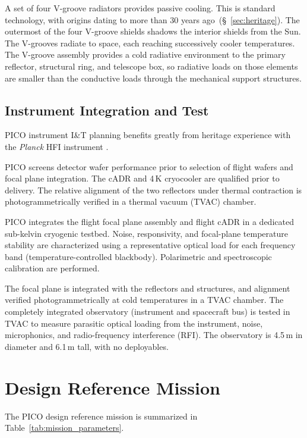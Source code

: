 A set of four V-groove radiators provides passive cooling. This is standard technology, with origins dating to more than 30 years ago~(\S~\ref{sec:heritage}). The outermost of the four V-groove shields shadows the interior shields from the Sun. The V-grooves radiate to space, each reaching successively cooler temperatures.
The V-groove assembly provides a cold radiative environment to the primary reflector, structural ring, and telescope box, so radiative loads on those elements are smaller than the conductive loads through the mechanical support structures.


\subsection{Instrument Integration and Test}
\label{sec:iandt} %

PICO instrument I\&T planning benefits greatly from heritage
experience with the \textit{Planck} HFI instrument \citep{ Pajot2010}.

PICO screens detector wafer performance prior to selection of
flight wafers and focal plane integration. The cADR and 4\,K
cryocooler are qualified prior to delivery. The relative alignment
of the two reflectors under thermal contraction is
photogrammetrically verified in a thermal vacuum (TVAC) chamber.

PICO integrates the flight focal plane assembly and flight cADR in
a dedicated sub-kelvin cryogenic testbed. Noise, responsivity, and focal-plane
temperature stability are characterized using a representative
optical load for each frequency band (temperature-controlled
blackbody). Polarimetric and spectroscopic calibration are
performed.

The focal plane is integrated with the reflectors and structures, and
alignment verified photogrammetrically at cold temperatures in a TVAC
chamber.  The completely integrated observatory (instrument and
spacecraft bus) is tested in TVAC to measure parasitic optical loading
from the instrument, noise, microphonics, and radio-frequency
interference (RFI). The observatory is 4.5\,m in diameter and 6.1\,m
tall, with no deployables.

\section{Design Reference Mission}
\label{sec:design_reference} %
The PICO design reference mission is summarized in Table~\ref{tab:mission_parameters}.

